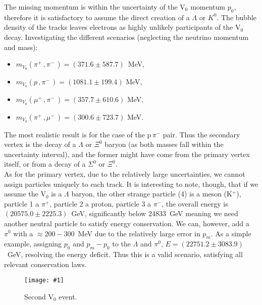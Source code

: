 \documentclass[twocolumn]{article}
\newcommand{\insertFigure}[1]{%
   \texttt{[image: \#1]}%
}
\begin{document}
The missing momentum is within the uncertainty of the V$_0$ momentum $p_0$, therefore it is satisfactory to assume the direct creation of a $\Lambda$ or $K^0$. The bubble density of the tracks leaves electrons as highly unlikely participants of the V$_0$ decay. Investigating the different scenarios (neglecting the neutrino momentum and mass):
\begin{itemize}
\item $m_{V_0} ( \pi^+ \, , \pi^-\, ) = (371.6 \pm 587.7) \, $ MeV,
\item $m_{V_0} ( p \, , \pi^- \, ) = (1081.1 \pm 199.4) $ MeV,
\item $m_{V_0} ( \mu^+ \, , \pi^- \, ) = (357.7 \pm 610.6)$ MeV,
\item $m_{V_0} ( \pi^+ \, , \mu^- \, ) = (300.6 \pm 723.7 )$ MeV.
\end{itemize}
The most realistic result is for the case of the p$\, \pi^-$ pair. Thus the secondary vertex is the decay of a $\Lambda$ or $\Xi^0$ baryon (as both masses fall within the uncertainty interval), and the former might have come from the primary vertex itself, or from a decay of a $\Sigma^0$ or $\Xi^0$.\\
As for the primary vertex, due to the relatively large uncertainties, we cannot assign particles uniquely to each track. It is interesting to note, though, that if we assume the V$_0$ is a $\Lambda$ baryon, the other strange particle (4) is a meson (K$^+$), particle 1 a $\pi^+$, particle 2 a proton, particle 3 a $\pi^-$, the overall energy is $(20575.0 \pm 2225.3)$~GeV, significantly below 24833~GeV meaning we need another neutral particle to satisfy energy conservation. We can, however, add a $\pi^0$ with a $\approx 200-300$~MeV due to the relatively large error in $p_m$. As a simple example, assigning $p_0$ and $p_m - p_0$ to the $\Lambda$ and $\pi^0$, $E = (22751.2 \pm 3083.9)$~GeV, resolving the energy deficit. Thus this is a valid scenario, satisfying all relevant conservation laws.
\begin{figure}
\insertFigure{Images/primary_2.png}
\caption{Second V$_0$ event.}
\label{fig:primary2}
\end{figure}
\end{document}
